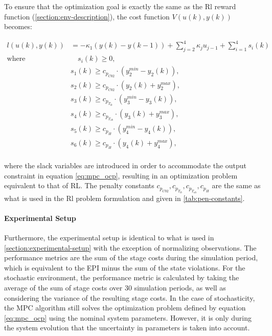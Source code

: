 To ensure that the optimization goal is exactly the same as the Rl reward function (\autoref{section:env-description}), the cost function $V(u(k),y(k))$ becomes:

\begin{equation} \label{eq:mpc_stage_cost}
	\begin{aligned}
		l(u(k),y(k)) & = - \kappa_1 (y(k) - y(k-1)) + \sum_{j=2}^4 {\kappa_j u_{j-1}} + \sum_{i = 1}^4 s_i(k) \\
		\text{where} & \quad s_i(k) \geq 0, \\
		& s_1(k) \geq c_{p_{C02}} \cdot (y_2^{min} - y_2(k)), \\ 
		& s_2(k) \geq c_{p_{C02}} \cdot (y_2(k) + y_2^{max}), \\ 
		& s_3(k) \geq c_{p_{T_{lb}}} \cdot (y_3^{min} - y_3(k)), \\ 
		& s_4(k) \geq c_{p_{T_{ub}}} \cdot (y_3(k) + y_3^{max}), \\ 
		& s_5(k) \geq c_{p_{H}} \cdot (y_4^{min} - y_4(k)), \\ 
		& s_6(k) \geq c_{p_{H}} \cdot (y_4(k) + y_4^{max}), \\
	\end{aligned}	
\end{equation}

where the slack variables are introduced in order to accommodate the output constraint in equation \autoref{eq:mpc_ocp}, resulting in an optimization problem equivalent to that of RL. The penalty constants $c_{p_{C02}},c_{p_{T_{lb}}},c_{p_{T_{ub}}},c_{p_{H}}$ are the same as what is used in the Rl problem formulation and given in \autoref{tab:pen-constants}.

\paragraph{Experimental Setup} Furthermore, the experimental setup is identical to what is used in \autoref{section:experimental-setup} with the exception of normalizing observations. The performance metrics are the sum of the stage costs during the simulation period, which is equivalent to the EPI minus the sum of the state violations. For the stochastic environment, the performance metric is calculated by taking the average of the sum of stage costs over 30 simulation periods, as well as considering the variance of the resulting stage costs. In the case of stochasticity, the MPC algorithm still solves the optimization problem defined by equation \autoref{eq:mpc_ocp} using the nominal system parameters. However, it is only during the system evolution that the uncertainty in parameters is taken into account. 

